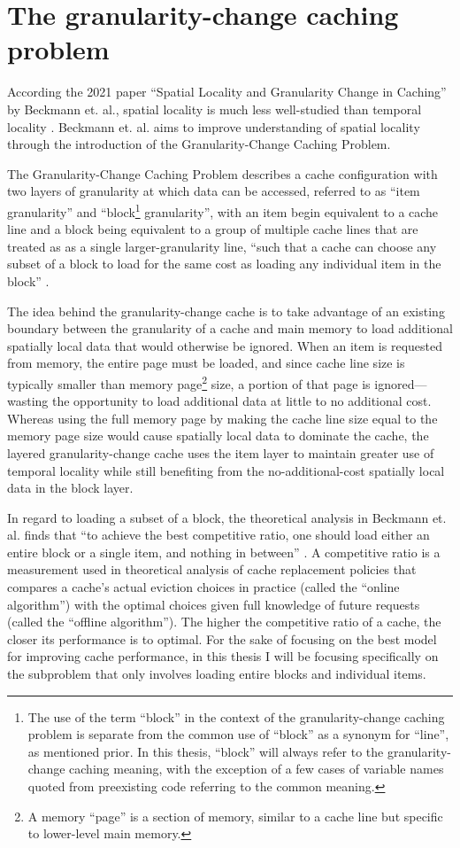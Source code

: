 \documentclass[12pt,twoside]{reedthesis}
\begin{document}
\section{The granularity-change caching problem}

According the 2021 paper ``Spatial Locality and Granularity Change in Caching'' by Beckmann et. al., spatial locality is much less well-studied than temporal locality  \cite{beckmann}. Beckmann et. al. aims to improve understanding of spatial locality through the introduction of the Granularity-Change Caching Problem.

The Granularity-Change Caching Problem describes a cache configuration with two layers of granularity at which data can be accessed, referred to as ``item granularity'' and ``block\footnote{The use of the term ``block'' in the context of the granularity-change caching problem is separate from the common use of ``block'' as a synonym for ``line'', as mentioned prior. In this thesis, ``block'' will always refer to the granularity-change caching meaning, with the exception of a few cases of variable names quoted from preexisting code referring to the common meaning.} granularity'', with an item begin equivalent to a cache line and a block being equivalent to a group of multiple cache lines that are treated as as a single larger-granularity line, ``such that a cache can choose any subset of a block to load for the same cost as loading any individual item in the block'' \cite{beckmann}.

The idea behind the granularity-change cache is to take advantage of an existing boundary between the granularity of a cache and main memory to load additional spatially local data that would otherwise be ignored. When an item is requested from memory, the entire page must be loaded, and since cache line size is typically smaller than memory page\footnote{A memory ``page'' is a section of memory, similar to a cache line but specific to lower-level main memory.} size, a portion of that page is ignored---wasting the opportunity to load additional data at little to no additional cost. Whereas using the full memory page by making the cache line size equal to the memory page size would cause spatially local data to dominate the cache, the layered granularity-change cache uses the item layer to maintain greater use of temporal locality while still benefiting from the no-additional-cost spatially local data in the block layer.

In regard to loading a subset of a block, the theoretical analysis in Beckmann et. al. finds that ``to achieve the best competitive ratio, one should load either an entire block or a single item, and nothing in between'' \cite{beckmann}. A competitive ratio is a measurement used in theoretical analysis of cache replacement policies that compares a cache's actual eviction choices in practice (called the ``online algorithm'') with the optimal choices given full knowledge of future requests (called the ``offline algorithm''). The higher the competitive ratio of a cache, the closer its performance is to optimal. For the sake of focusing on the best model for improving cache performance, in this thesis I will be focusing specifically on the subproblem that only involves loading entire blocks and individual items.
\end{document}
